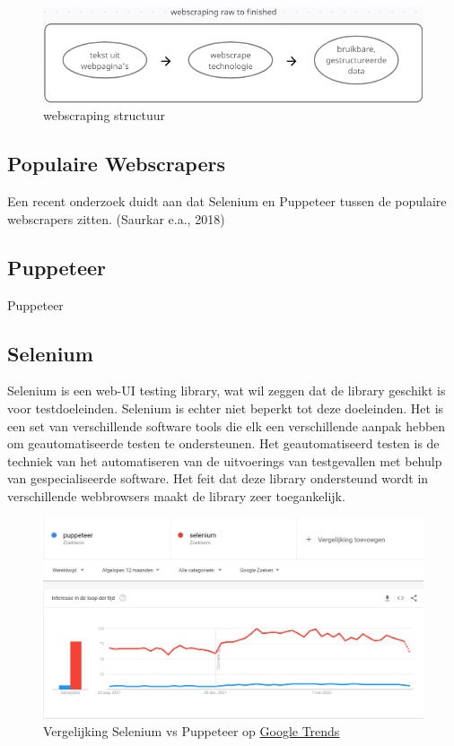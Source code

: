\begin{figure}[bh]
	\centering
	\includegraphics{webscraping_cycle}
	\caption{webscraping structuur}
\end{figure}

\subsection{Populaire Webscrapers}

Een recent onderzoek duidt aan dat Selenium en Puppeteer tussen de populaire webscrapers zitten. (Saurkar e.a., 2018)


\subsection{Puppeteer}

Puppeteer

\subsection{Selenium}

Selenium is een web-UI testing library, wat wil zeggen dat de library geschikt is voor testdoeleinden. Selenium is echter niet beperkt tot deze doeleinden. Het is een set van verschillende software tools die elk een verschillende aanpak hebben om geautomatiseerde testen te ondersteunen. Het geautomatiseerd testen is de techniek van het automatiseren van de uitvoerings van testgevallen met behulp van gespecialiseerde software. Het feit dat deze library ondersteund wordt in verschillende webbrowsers maakt de library zeer toegankelijk.

\begin{figure}[bh]
	\centering
	\includegraphics[width=\paperwidth, height=\textheight, keepaspectratio]{selenium_puppeteer_google_trends}
	\caption{Vergelijking Selenium vs Puppeteer op \href{https://trends.google.com/trends}{Google Trends}}
\end{figure}

